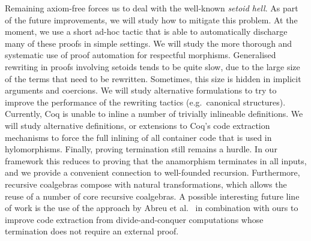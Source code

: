 \documentclass[a4paper,anonymous, UKenglish,cleveref, autoref, thm-restate]{lipics-v2021}
\begin{document}
Remaining axiom-free forces us to deal with the well-known
\emph{setoid hell}. As part of the future improvements, we will study how to
mitigate this problem. At the moment, we use a short ad-hoc tactic that is able
to automatically discharge many of these proofs in simple settings.  We will
study the more thorough and systematic use of proof automation for respectful
morphisms.  Generalised rewriting in proofs involving setoids tends to be quite
slow, due to the large size of the terms that need to be rewritten. Sometimes,
this size is hidden in implicit arguments and coercions. We will study
alternative formulations to try to improve the performance of the rewriting
tactics (e.g.\ canonical structures).  Currently, Coq is unable to inline a
number of trivially inlineable definitions.  We will study alternative
definitions, or extensions to Coq's code extraction mechanisms to force the
full inlining of all container code that is used in hylomorphisms.  Finally,
proving termination still remains a hurdle. In our framework this reduces to
proving that the anamorphism
terminates in all inputs, and we provide a convenient connection to
well-founded recursion. Furthermore, recursive coalgebras compose with natural
transformations, which allows the reuse
of a number of core recursive coalgebras. A possible interesting future line of work
is the use of the approach by Abreu et al.~\cite{AbreuDHJMS23} in combination with ours to
improve code extraction from divide-and-conquer computations whose termination
does not require an external proof. 




\end{document}
